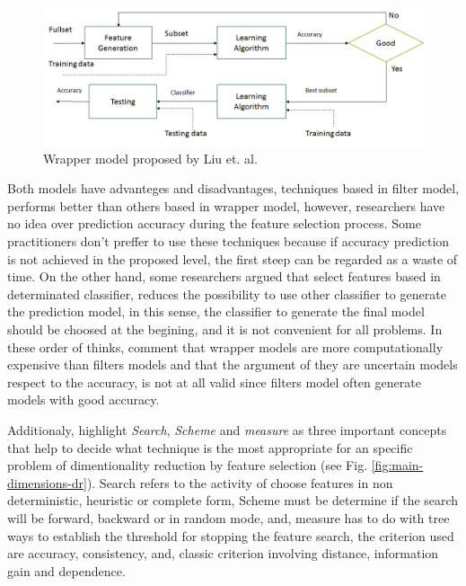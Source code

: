 \documentclass[]{book}
\begin{document}
\begin{figure}[H]

{\centering \includegraphics[width=0.6\linewidth]{images/wrapper-model} 

}

\caption{Wrapper model proposed by Liu et. al.}\label{fig:wrapper-model}
\end{figure}

Both models have advanteges and disadvantages, techniques based in
filter model, performs better than others based in wrapper model,
however, researchers have no idea over prediction accuracy during the
feature selection process. Some practitioners don't preffer to use these
techniques because if accuracy prediction is not achieved in the
proposed level, the first steep can be regarded as a waste of time. On
the other hand, some researchers argued that select features based in
determinated classifier, reduces the possibility to use other classifier
to generate the prediction model, in this sense, the classifier to
generate the final model should be choosed at the begining, and it is
not convenient for all problems. In these order of thinks,
\citep{Kelleher2015} comment that wrapper models are more
computationally expensive than filters models and that the argument of
they are uncertain models respect to the accuracy, is not at all valid
since filters model often generate models with good accuracy.

Additionaly, \citep{Liu1998} highlight \emph{Search}, \emph{Scheme} and
\emph{measure} as three important concepts that help to decide what
technique is the most appropriate for an specific problem of
dimentionality reduction by feature selection (see Fig.
\ref{fig:main-dimensions-dr}). Search refers to the activity of choose
features in non deterministic, heuristic or complete form, Scheme must
be determine if the search will be forward, backward or in random mode,
and, measure has to do with tree ways to establish the threshold for
stopping the feature search, the criterion used are accuracy,
consistency, and, classic criterion involving distance, information gain
and dependence.
\end{document}
